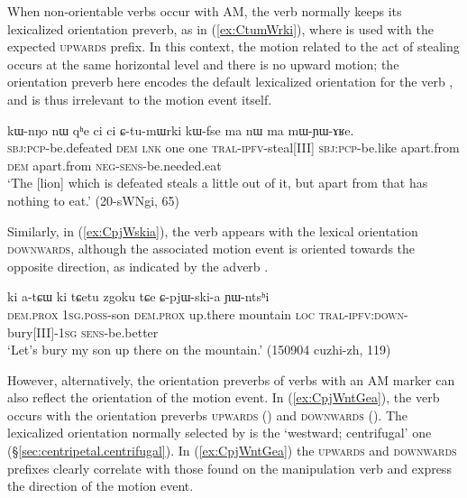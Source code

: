 When non-orientable verbs occur with AM, the verb normally keeps its lexicalized orientation preverb, as in (\ref{ex:CtumWrki}), where  is used with the expected  \textsc{upwards} prefix. In this context, the motion related to the act of stealing occurs at the same horizontal level and there is no upward motion; the orientation preverb here encodes the default lexicalized orientation for the verb , and is thus irrelevant to the motion event itself.

\begin{exe}
\ex \label{ex:CtumWrki}
 \gll kɯ-nŋo nɯ qʰe ci ci ɕ-tu-mɯrki kɯ-fse ma nɯ ma mɯ-ɲɯ-ɤʁe. \\
\textsc{sbj}:\textsc{pcp}-be.defeated \textsc{dem} \textsc{lnk} one one \textsc{tral}-\textsc{ipfv}-steal[III] \textsc{sbj}:\textsc{pcp}-be.like apart.from \textsc{dem} apart.from \textsc{neg}-\textsc{sens}-be.needed.eat \\
\glt `The [lion] which is defeated steals a little out of it, but apart from that has nothing to eat.' (20-sWNgi, 65)
\end{exe}

Similarly, in (\ref{ex:CpjWskia}), the verb  appears with the lexical orientation \textsc{downwards}, although the associated motion event is oriented towards the opposite direction, as indicated by the adverb .

\begin{exe}
\ex \label{ex:CpjWskia}
 \gll ki a-tɕɯ ki tɕetu zgoku tɕe ɕ-pjɯ-ski-a ɲɯ-ntsʰi \\
 \textsc{dem}.\textsc{prox} \textsc{1sg}.\textsc{poss}-son \textsc{dem}.\textsc{prox} up.there mountain \textsc{loc} \textsc{tral}-\textsc{ipfv}:\textsc{down}-bury[III]-\textsc{1sg} \textsc{sens}-be.better \\
 \glt `Let's bury my son up there on the mountain.' (150904 cuzhi-zh, 119)
\end{exe}

However, alternatively, the orientation preverbs of verbs with an AM marker can also reflect the orientation of the motion event. In (\ref{ex:CpjWntGea}), the verb  occurs with the orientation preverbs \textsc{upwards} () and \textsc{downwards}  (). The lexicalized orientation normally selected by   is the `westward; centrifugal' one (§\ref{sec:centripetal.centrifugal}). In (\ref{ex:CpjWntGea}) the \textsc{upwards} and \textsc{downwards} prefixes clearly correlate with those found on the manipulation verb  and express the direction of the motion event.

